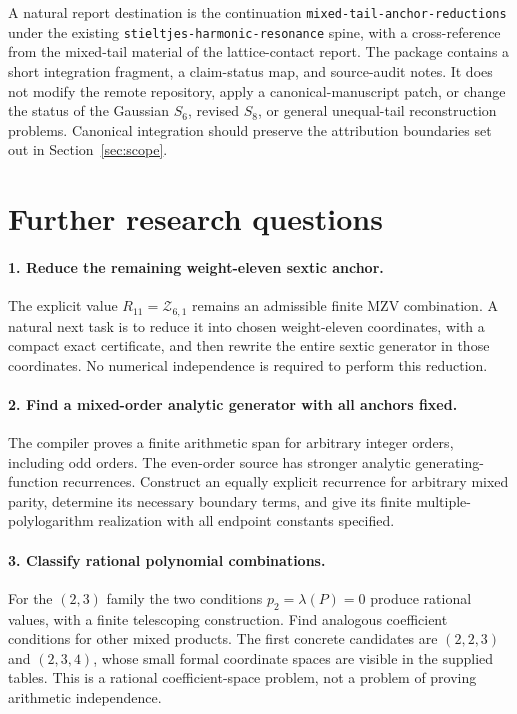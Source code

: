 \documentclass[11pt,letterpaper]{article}
\numberwithin{equation}{section}
\theoremstyle{definition}\newtheorem{definition}[theorem]{Definition}
\theoremstyle{remark}\newtheorem{remark}[theorem]{Remark}
\newcommand{\sref}[1]{\texttt{#1}}
\begin{document}
A natural report destination is the continuation
\sref{mixed-tail-anchor-reductions} under the existing
\sref{stieltjes-harmonic-resonance} spine, with a cross-reference
from the mixed-tail material of the lattice-contact report.
The package contains a short integration fragment, a claim-status
map, and source-audit notes. It does not modify the remote repository,
apply a canonical-manuscript patch, or change the status of the
Gaussian $S_6$, revised $S_8$, or general unequal-tail reconstruction
problems. Canonical integration should preserve the attribution
boundaries set out in Section~\ref{sec:scope}.

\section{Further research questions}
\label{sec:questions}

\paragraph{1. Reduce the remaining weight-eleven sextic anchor.}
The explicit value $R_{11}=\mathcal Z_{6,1}$ remains an admissible
finite MZV combination. A natural next task is to reduce it into
chosen weight-eleven coordinates, with a compact exact certificate,
and then rewrite the entire sextic generator in those coordinates.
No numerical independence is required to perform this reduction.

\paragraph{2. Find a mixed-order analytic generator with all anchors fixed.}
The compiler proves a finite arithmetic span for arbitrary integer
orders, including odd orders. The even-order source has stronger
analytic generating-function recurrences. Construct an equally
explicit recurrence for arbitrary mixed parity, determine its
necessary boundary terms, and give its finite multiple-polylogarithm
realization with all endpoint constants specified.

\paragraph{3. Classify rational polynomial combinations.}
For the $(2,3)$ family the two conditions $p_2=\lambda(P)=0$
produce rational values, with a finite telescoping construction.
Find analogous coefficient conditions for other mixed products.
The first concrete candidates are $(2,2,3)$ and $(2,3,4)$, whose
small formal coordinate spaces are visible in the supplied tables.
This is a rational coefficient-space problem, not a problem of
proving arithmetic independence.
\end{document}
